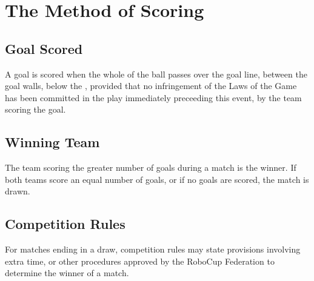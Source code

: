 \section{The Method of Scoring}\label{sec:method-of-scoring}

\subsection{Goal Scored}
A goal is scored when the whole of the ball passes over the goal line, between the goal walls, below the  , provided that no infringement of the Laws of the Game has been committed in the play immediately preceeding this event, by the team scoring the goal.

\subsection{Winning Team}
The team scoring the greater number of goals during a match is the winner.
If both teams score an equal number of goals, or if no goals are scored, the match is drawn.

\subsection{Competition Rules}
For matches ending in a draw, competition rules may state provisions involving extra time, or other procedures approved by the RoboCup Federation to determine the winner of a match.

